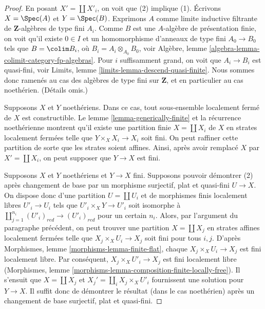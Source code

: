 \begin{proof}
En posant $X' = \coprod X'_i$, on voit que (2) implique (1).
\'Ecrivons $X = \Spec(A)$ et $Y = \Spec(B)$. Exprimons $A$ comme limite inductive filtrante
de $\mathbf{Z}$-alg\`ebres de type fini $A_i$. Comme $B$ est une $A$-alg\`ebre de
pr\'esentation finie, on voit qu'il existe $0 \in I$ et un
homomorphisme d'anneaux de type fini $A_0 \to B_0$ tels que $B = \colim B_i$, o\`u
$B_i = A_i \otimes_{A_0} B_0$, voir
Algèbre, lemme \ref{algebra-lemma-colimit-category-fp-algebras}.
Pour $i$ suffisamment grand, on voit que $A_i \to B_i$ est
quasi-fini, voir Limits, lemme \ref{limits-lemma-descend-quasi-finite}.
Nous sommes donc ramen\'es au cas des alg\`ebres de type fini sur $\mathbf{Z}$,
et en particulier au cas noeth\'erien. (D\'etails omis.)

\medskip\noindent
Supposons $X$ et $Y$ noeth\'eriens. Dans ce cas, tout sous-ensemble localement ferm\'e
de $X$ est constructible. Le lemme \ref{lemma-generically-finite}
et la r\'ecurrence noeth\'erienne montrent qu'il existe
une partition finie $X = \coprod X_i$ de $X$
en strates localement ferm\'ees telle que $Y \times_X X_i \to X_i$ soit fini.
On peut raffiner cette partition de sorte que les strates soient affines.
Ainsi, apr\`es avoir remplac\'e $X$ par $X' = \coprod X_i$, on peut supposer que
$Y \to X$ est fini.

\medskip\noindent
Supposons $X$ et $Y$ noeth\'eriens et $Y \to X$ fini.
Supposons pouvoir d\'emontrer (2) apr\`es changement de base par un morphisme
surjectif, plat et quasi-fini $U \to X$. On dispose donc d'une partition
$U = \coprod U_i$ et de morphismes finis localement libres $U'_i \to U_i$
tels que $U'_i \times_X Y \to U'_i$ soit isomorphe \`a
$\coprod_{j = 1}^{n_i} (U'_i)_{red} \to (U'_i)_{red}$ pour un certain $n_i$.
Alors, par l'argument du paragraphe pr\'ec\'edent, on peut trouver une
partition $X = \coprod X_j$ en strates affines localement ferm\'ees telle que
$X_j \times_X U_i \to X_j$ soit fini pour tous $i, j$. D'apr\`es
Morphismes, lemme \ref{morphisms-lemma-finite-flat},
chaque $X_j \times_X U_i \to X_j$ est fini localement libre.
Par cons\'equent, $X_j \times_X U'_i \to X_j$ est fini localement libre
(Morphismes, lemme \ref{morphisms-lemma-composition-finite-locally-free}).
Il s'ensuit que $X = \coprod X_j$ et $X_j' = \coprod_i X_j \times_X U'_i$
fournissent une solution pour $Y \to X$. Il suffit donc de d\'emontrer
le r\'esultat (dans le cas noeth\'erien) apr\`es un changement de base surjectif,
plat et quasi-fini.


\end{proof}
